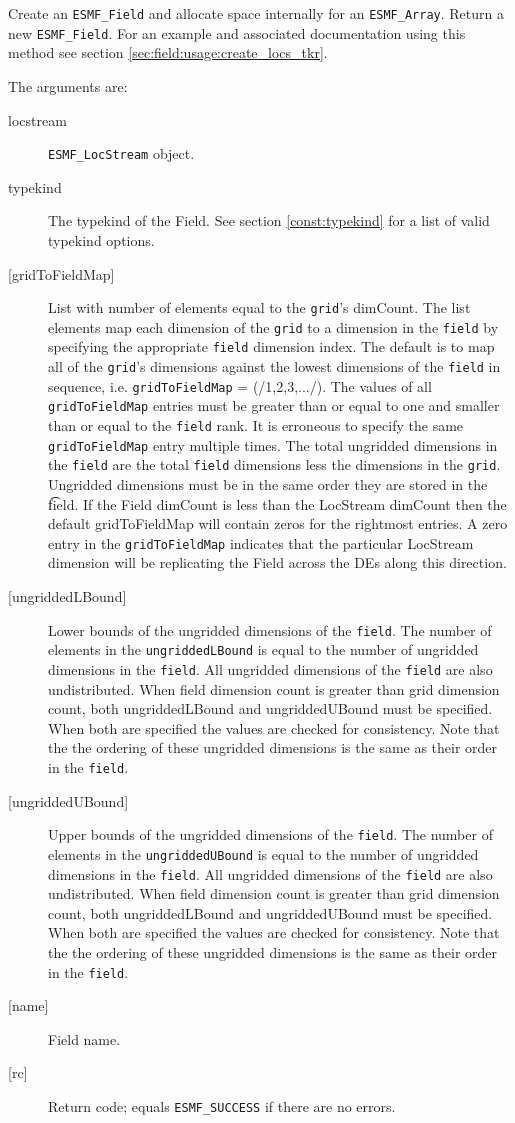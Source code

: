   Create an {\tt ESMF\_Field} and allocate space internally for an
   {\tt ESMF\_Array}. Return a new {\tt ESMF\_Field}. For an example and
   associated documentation using this method see section
   \ref{sec:field:usage:create_locs_tkr}.
  
   The arguments are:
   \begin{description}
   \item [locstream]
   {\tt ESMF\_LocStream} object.
   \item[typekind]
   The typekind of the Field. See section \ref{const:typekind}
   for a list of valid typekind options.
   \item [{[gridToFieldMap]}]
   List with number of elements equal to the
   {\tt grid}'s dimCount. The list elements map each dimension
   of the {\tt grid} to a dimension in the {\tt field} by
   specifying the appropriate {\tt field} dimension index. The default is to
   map all of the {\tt grid}'s dimensions against the lowest dimensions of
   the {\tt field} in sequence, i.e. {\tt gridToFieldMap} = (/1,2,3,.../).
   The values of all {\tt gridToFieldMap} entries must be greater than or equal
   to one and smaller than or equal to the {\tt field} rank.
   It is erroneous to specify the same {\tt gridToFieldMap} entry
   multiple times. The total ungridded dimensions in the {\tt field}
   are the total {\tt field} dimensions less
   the dimensions in
   the {\tt grid}. Ungridded dimensions must be in the same order they are
   stored in the {\t field}.
   If the Field dimCount is less than the LocStream dimCount then the default
   gridToFieldMap will contain zeros for the rightmost entries. A zero
   entry in the {\tt gridToFieldMap} indicates that the particular
   LocStream dimension will be replicating the Field across the DEs along
   this direction.
   \item [{[ungriddedLBound]}]
   Lower bounds of the ungridded dimensions of the {\tt field}.
   The number of elements in the {\tt ungriddedLBound} is equal to the number of ungridded
   dimensions in the {\tt field}. All ungridded dimensions of the
   {\tt field} are also undistributed. When field dimension count is
   greater than grid dimension count, both ungriddedLBound and ungriddedUBound
   must be specified. When both are specified the values are checked
   for consistency. Note that the the ordering of
   these ungridded dimensions is the same as their order in the {\tt field}.
   \item [{[ungriddedUBound]}]
   Upper bounds of the ungridded dimensions of the {\tt field}.
   The number of elements in the {\tt ungriddedUBound} is equal to the number of ungridded
   dimensions in the {\tt field}. All ungridded dimensions of the
   {\tt field} are also undistributed. When field dimension count is
   greater than grid dimension count, both ungriddedLBound and ungriddedUBound
   must be specified. When both are specified the values are checked
   for consistency. Note that the the ordering of
   these ungridded dimensions is the same as their order in the {\tt field}.
   \item [{[name]}]
   Field name.
   \item [{[rc]}]
   Return code; equals {\tt ESMF\_SUCCESS} if there are no errors.
   \end{description} 

